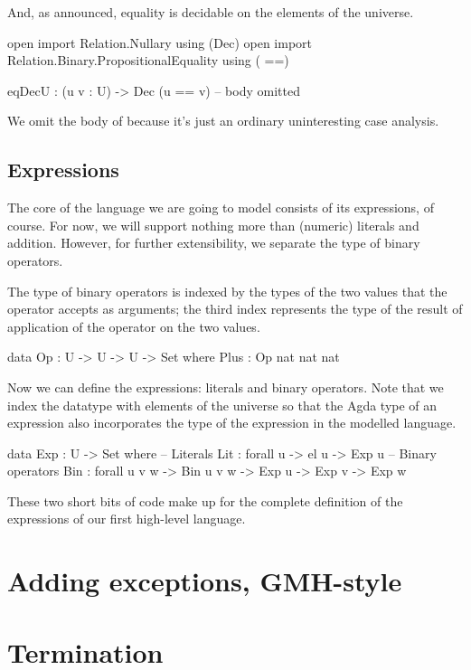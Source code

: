 \noindent And, as announced, equality is decidable on the elements of the
universe.

\begin{code}
  open import Relation.Nullary using (Dec)
  open import Relation.Binary.PropositionalEquality using ( ==)

  eqDecU : (u v : U) -> Dec (u == v)
  -- body omitted
\end{code}

\noindent We omit the body of  because it's just an ordinary
uninteresting case analysis.

\subsection{Expressions}

The core of the language we are going to model consists of its expressions, of
course. For now, we will support nothing more than (numeric) literals and addition.
However, for further extensibility, we separate the type of binary operators.

The type of binary operators is indexed by the types of the two values that
the operator accepts as arguments; the third index represents the type of
the result of application of the operator on the two values.

\begin{code}
  data Op : U -> U -> U -> Set where
    Plus : Op nat nat nat
\end{code}

\noindent Now we can define the expressions: literals and binary operators.
Note that we index the datatype with elements of the universe  so that
the Agda type of an expression also incorporates the type of the expression in
the modelled language.

\begin{code}
  data Exp : U -> Set where
    -- Literals
    Lit : forall {u} -> el u -> Exp u
    -- Binary operators
    Bin : forall {u v w} -> Bin u v w -> Exp u -> Exp v -> Exp w
\end{code}

These two short bits of code make up for the complete definition of the expressions
of our first high-level language.

\section{Adding exceptions, GMH-style}

\section{Termination}
